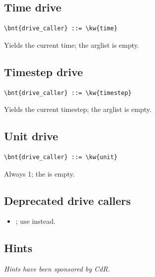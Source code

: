 
\subsection{Time drive}
\begin{Verbatim}[commandchars=\\\{\}]
    \bnt{drive_caller} ::= \kw{time}
\end{Verbatim}
Yields the current time; the arglist is empty.

\subsection{Timestep drive}
\begin{Verbatim}[commandchars=\\\{\}]
    \bnt{drive_caller} ::= \kw{timestep}
\end{Verbatim}
Yields the current timestep; the arglist is empty.

\subsection{Unit drive}
\begin{Verbatim}[commandchars=\\\{\}]
    \bnt{drive_caller} ::= \kw{unit}
\end{Verbatim}
Always 1; the  is empty.

\subsection{Deprecated drive callers}
\begin{itemize}
\item {}; use  instead.
\end{itemize}








\subsection{Hints}\label{sec:GENERAL:DRIVE:HINT}
\emph{Hints have been sponsored
by  CdR.}
\bigskip

